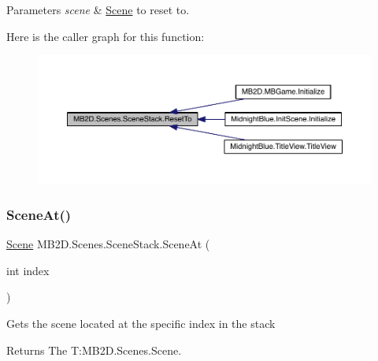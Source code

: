 \begin{DoxyParams}{Parameters}
{\em scene} & \hyperlink{class_m_b2_d_1_1_scenes_1_1_scene}{Scene} to reset to.\\
\hline
\end{DoxyParams}
Here is the caller graph for this function\+:\nopagebreak
\begin{figure}[H]
\begin{center}
\leavevmode
\includegraphics[width=350pt]{class_m_b2_d_1_1_scenes_1_1_scene_stack_a521a38426d3e85caeb53b2909b623562_icgraph}
\end{center}
\end{figure}
\hypertarget{class_m_b2_d_1_1_scenes_1_1_scene_stack_a84b1a5b2771f6c663eece04bcafd5416}{}\label{class_m_b2_d_1_1_scenes_1_1_scene_stack_a84b1a5b2771f6c663eece04bcafd5416} 
\subsubsection{\texorpdfstring{Scene\+At()}{SceneAt()}}
{\footnotesize\ttfamily \hyperlink{class_m_b2_d_1_1_scenes_1_1_scene}{Scene} M\+B2\+D.\+Scenes.\+Scene\+Stack.\+Scene\+At (\begin{DoxyParamCaption}\item[{int}]{index }\end{DoxyParamCaption})\hspace{0.3cm}{\ttfamily [inline]}}



Gets the scene located at the specific index in the stack 

\begin{DoxyReturn}{Returns}
The T\+:\+M\+B2\+D.\+Scenes.\+Scene.
\end{DoxyReturn}

